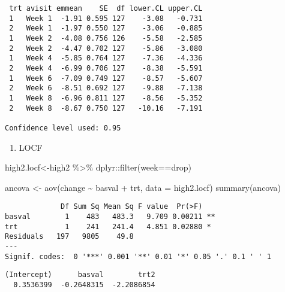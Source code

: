 \documentclass[
  letterpaper,
  DIV=11,
  numbers=noendperiod]{scrreprt}
\newenvironment{Shaded}{\begin{snugshade}}{\end{snugshade}}
\newcommand{\AttributeTok}[1]{\textcolor[rgb]{0.40,0.45,0.13}{#1}}
\newcommand{\FunctionTok}[1]{\textcolor[rgb]{0.28,0.35,0.67}{#1}}
\newcommand{\NormalTok}[1]{\textcolor[rgb]{0.00,0.23,0.31}{#1}}
\newcommand{\OtherTok}[1]{\textcolor[rgb]{0.00,0.23,0.31}{#1}}
\newcommand{\SpecialCharTok}[1]{\textcolor[rgb]{0.37,0.37,0.37}{#1}}
\providecommand{\tightlist}{%
  \setlength{\itemsep}{0pt}\setlength{\parskip}{0pt}}\usepackage{longtable,booktabs,array}
\begin{document}
\begin{verbatim}
 trt avisit emmean    SE  df lower.CL upper.CL
 1   Week 1  -1.91 0.595 127    -3.08   -0.731
 2   Week 1  -1.97 0.550 127    -3.06   -0.885
 1   Week 2  -4.08 0.756 126    -5.58   -2.585
 2   Week 2  -4.47 0.702 127    -5.86   -3.080
 1   Week 4  -5.85 0.764 127    -7.36   -4.336
 2   Week 4  -6.99 0.706 127    -8.38   -5.591
 1   Week 6  -7.09 0.749 127    -8.57   -5.607
 2   Week 6  -8.51 0.692 127    -9.88   -7.138
 1   Week 8  -6.96 0.811 127    -8.56   -5.352
 2   Week 8  -8.67 0.750 127   -10.16   -7.191

Confidence level used: 0.95 
\end{verbatim}

\begin{enumerate}
\def\labelenumi{\arabic{enumi}.}
\setcounter{enumi}{2}
\tightlist
\item
  LOCF
\end{enumerate}

\begin{Shaded}
\begin{Highlighting}[]
\NormalTok{high2.locf}\OtherTok{\textless{}{-}}\NormalTok{high2 }\SpecialCharTok{\%\textgreater{}\%}\NormalTok{ dplyr}\SpecialCharTok{::}\FunctionTok{filter}\NormalTok{(week}\SpecialCharTok{==}\NormalTok{drop)}

\NormalTok{ancova }\OtherTok{\textless{}{-}} \FunctionTok{aov}\NormalTok{(change }\SpecialCharTok{\textasciitilde{}}\NormalTok{ basval }\SpecialCharTok{+}\NormalTok{ trt, }\AttributeTok{data =}\NormalTok{ high2.locf)}
\FunctionTok{summary}\NormalTok{(ancova)}
\end{Highlighting}
\end{Shaded}

\begin{verbatim}
             Df Sum Sq Mean Sq F value  Pr(>F)   
basval        1    483   483.3   9.709 0.00211 **
trt           1    241   241.4   4.851 0.02880 * 
Residuals   197   9805    49.8                   
---
Signif. codes:  0 '***' 0.001 '**' 0.01 '*' 0.05 '.' 0.1 ' ' 1
\end{verbatim}

\begin{Shaded}
\end{Shaded}

\begin{verbatim}
(Intercept)      basval        trt2 
  0.3536399  -0.2648315  -2.2086854 
\end{verbatim}
\end{document}
